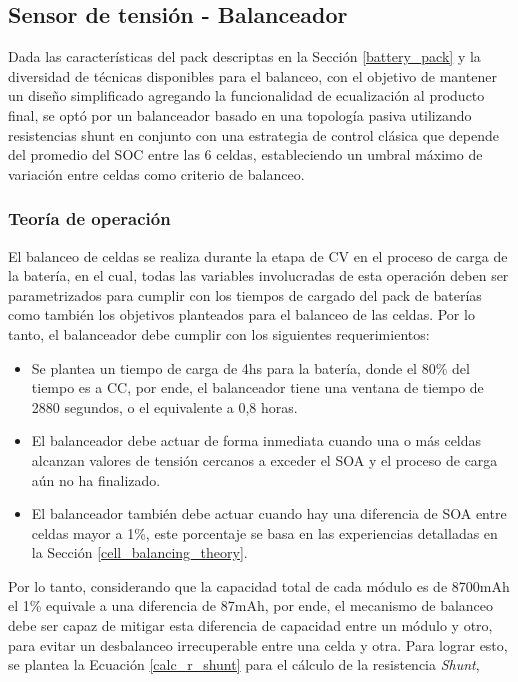 \documentclass[10pt, a4paper]{article}
\begin{document}
\subsection{Sensor de tensi\'on - Balanceador}

Dada las caracter\'isticas del pack descriptas en la Secci\'on \ref{battery_pack} 
y la diversidad de t\'ecnicas disponibles para el balanceo, con el objetivo de
mantener un diseño simplificado agregando la funcionalidad de ecualizaci\'on al
producto final, se opt\'o por un balanceador basado en una topolog\'ia pasiva 
utilizando resistencias shunt en conjunto con una estrategia de control
cl\'asica que depende del promedio del \acrshort{SOC} entre las 6 celdas,
estableciendo un umbral m\'aximo de variaci\'on entre celdas como criterio de
balanceo. 

\subsubsection{Teor\'ia de operaci\'on}

El balanceo de celdas se realiza durante la etapa de \acrshort{CV} en el proceso
de carga de la bater\'ia, en el cual, todas las variables involucradas de esta
operaci\'on deben ser parametrizados para cumplir con los tiempos de cargado del
pack de bater\'ias como tambi\'en los objetivos planteados para el balanceo de
las celdas. Por lo tanto, el balanceador debe cumplir con los siguientes
requerimientos:

\begin{itemize}
    \item Se plantea un tiempo de carga de 4hs para la bater\'ia, donde el 80\%
        del tiempo es a \acrshort{CC}, por ende, el balanceador tiene una
       ventana de tiempo de 2880 segundos, o el equivalente a 0,8 horas.
    \item El balanceador debe actuar de forma inmediata cuando una o m\'as
        celdas alcanzan valores de tensi\'on cercanos a exceder el 
        \acrshort{SOA} y el proceso de carga a\'un no ha finalizado.
    \item El balanceador tambi\'en debe actuar cuando hay una diferencia de
        \acrshort{SOA} entre celdas mayor a 1\%, este porcentaje se basa en las
        experiencias detalladas en la Secci\'on \ref{cell_balancing_theory}.
\end{itemize}

Por lo tanto, considerando que la capacidad total de cada m\'odulo es de 8700mAh
el 1\% equivale a una diferencia de 87mAh, por ende, el mecanismo de
balanceo debe ser capaz de mitigar esta diferencia de capacidad entre un
m\'odulo y otro, para evitar un desbalanceo irrecuperable entre una celda y
otra. Para lograr esto, se plantea la Ecuaci\'on \ref{calc_r_shunt} para el 
c\'alculo de la resistencia \emph{Shunt},
\end{document}
